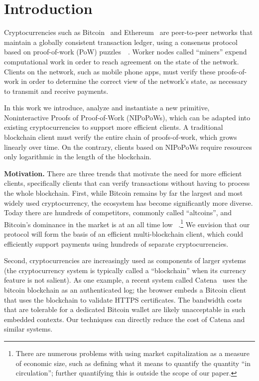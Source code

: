 \section{Introduction}

Cryptocurrencies such as Bitcoin~\cite{bitcoin}\cite{bitcoinsoftware} and
Ethereum~\cite{ethereum} are
peer-to-peer networks that maintain a globally consistent transaction ledger,
using a consensus protocol based on proof-of-work (PoW)
puzzles~\cite{pow}~\cite{hashcash}. Worker nodes called ``miners'' expend
computational work in order to reach agreement on the state of the network.
Clients on the network, such as mobile phone apps, must verify these
proofs-of-work in order to determine the correct view of the network's state, as
necessary to transmit and receive payments.

In this work we introduce, analyze and instantiate a new primitive,
Noninteractive Proofs of Proof-of-Work (NIPoPoWs), which can be adapted into
existing cryptocurrencies to support more efficient clients. A traditional
blockchain client must verify the entire chain of proofs-of-work, which grows
linearly over time. On the contrary, clients based on NIPoPoWs require resources
only logarithmic in the length of the blockchain.

\textbf{Motivation.}
There are three trends that motivate the need for more efficient clients,
specifically clients that can verify transactions without having to process the
whole blockchain. First, while Bitcoin remains by far the largest and most
widely used cryptocurrency, the ecosystem has become significantly more diverse.
Today there are hundreds of competitors, commonly called ``altcoins'', and
Bitcoin's dominance in the market is at an all time low
~\cite{marketcap}.\footnote{There are numerous problems with using  market
capitalization as a measure of economic size, such as defining what it means to
quantify the quantity ``in circulation''; further quantifying this is outside
the scope of our paper.} We envision that our protocol will form the basis of an
efficient multi-blockchain client, which could efficiently support payments
using hundreds of separate cryptocurrencies.

Second, cryptocurrencies are increasingly used as components of larger systems
(the cryptocurrency system is typically called a ``blockchain'' when its
currency feature is not salient). As one example, a recent system called
Catena~\cite{catena} uses the bitcoin blockchain as an authenticated log; the
browser embeds a Bitcoin client that uses the blockchain to validate HTTPS
certificates. The bandwidth costs that are tolerable for a dedicated Bitcoin
wallet are likely unacceptable in such embedded contexts. Our techniques can
directly reduce the cost of Catena and similar systems.

